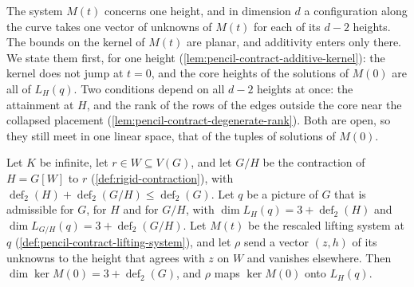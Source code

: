 The system $M(t)$ concerns one height, and in dimension $d$ a
configuration along the curve takes one vector of unknowns of $M(t)$ for
each of its $d - 2$ heights. The bounds on the kernel of $M(t)$ are
planar, and additivity enters only there. We state them first, for one
height (\cref{lem:pencil-contract-additive-kernel}): the kernel does not
jump at $t = 0$, and the core heights of the solutions of $M(0)$ are all
of $L_H(q)$. Two conditions depend on all $d - 2$ heights at once: the
attainment at $H$, and the rank of the rows of the edges outside the core
near the collapsed placement
(\cref{lem:pencil-contract-degenerate-rank}). Both are open, so they
still meet in one linear space, that of the tuples of solutions of
$M(0)$.

\begin{lemma}
  \label{lem:pencil-contract-additive-kernel}
  \leanok
  Let $K$ be infinite, let $r \in W \subseteq V(G)$, and let $G/H$ be the
  contraction of $H = G[W]$ to $r$ (\cref{def:rigid-contraction}), with
  $\operatorname{def}_2(H) + \operatorname{def}_2(G/H) \le
  \operatorname{def}_2(G)$. Let $q$ be a picture of $G$ that is
  admissible for $G$, for $H$ and for $G/H$, with
  $\dim L_H(q) = 3 + \operatorname{def}_2(H)$ and
  $\dim L_{G/H}(q) = 3 + \operatorname{def}_2(G/H)$. Let $M(t)$ be the
  rescaled lifting system at $q$
  (\cref{def:pencil-contract-lifting-system}), and let $\rho$ send a
  vector $(z, h)$ of its unknowns to the height that agrees with $z$ on
  $W$ and vanishes elsewhere. Then
  $\dim \ker M(0) = 3 + \operatorname{def}_2(G)$, and $\rho$ maps
  $\ker M(0)$ onto $L_H(q)$.
\end{lemma}

